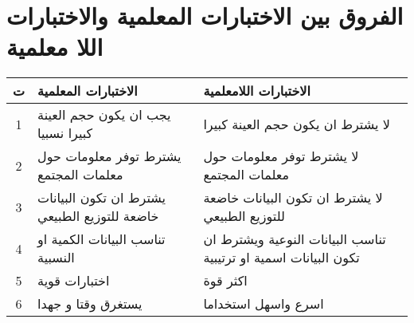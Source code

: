 	\section{الفروق بين الاختبارات المعلمية والاختبارات اللا معلمية}
	\begin{center}
		\begin{tabular}{|c|>{\raggedleft\arraybackslash}p{5cm}|>{\raggedleft\arraybackslash}p{5cm}|}
			\hline
			\textbf{ت} & \textbf{الاختبارات المعلمية} & \textbf{الاختبارات اللامعلمية} \\
			\hline
			1 & يجب ان يكون حجم العينة كبيرا نسبيا & لا يشترط ان يكون حجم العينة كبيرا \\
			\hline
			2 & يشترط توفر معلومات حول معلمات المجتمع & لا يشترط توفر معلومات حول معلمات المجتمع \\
			\hline
			3 & يشترط ان تكون البيانات خاضعة للتوزيع الطبيعي & لا يشترط ان تكون البيانات خاضعة للتوزيع الطبيعي \\
			\hline
			4 & تناسب البيانات الكمية او النسبية & تناسب البيانات النوعية ويشترط ان تكون البيانات اسمية او ترتيبية \\
			\hline
			5 & اختبارات قوية & اكثر قوة \\
			\hline
			6 & يستغرق وقتا و جهدا & اسرع واسهل استخداما \\
			\hline
		\end{tabular}
	\end{center}

	




